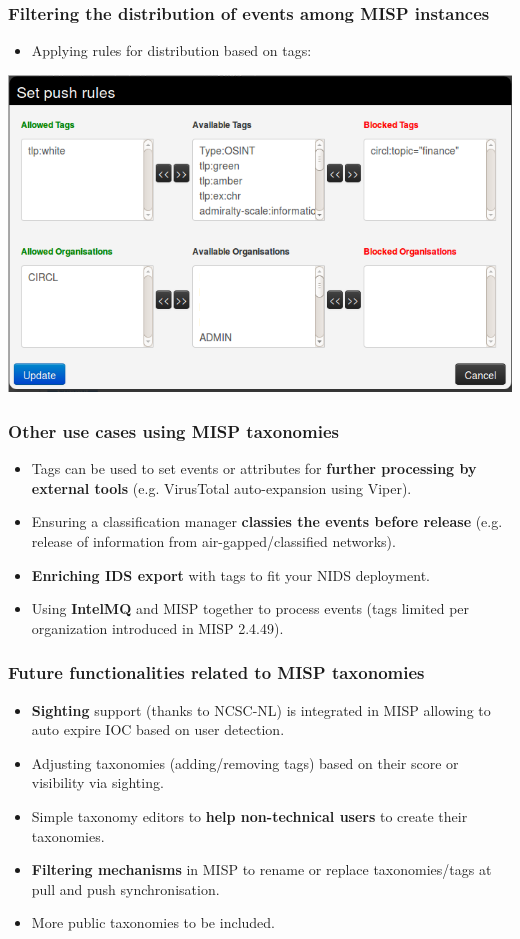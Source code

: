 \begin{frame}
\frametitle{Filtering the distribution of events among MISP instances}
\begin{itemize}
\item Applying rules for distribution based on tags:
\end{itemize}
\includegraphics[scale=0.45]{tagspush.png}
\end{frame}

\begin{frame}
        \frametitle{Other use cases using MISP taxonomies}
\begin{itemize}
    \item Tags can be used to set events or attributes for {\bf further processing by external tools} (e.g. VirusTotal auto-expansion using Viper).
    \item Ensuring a classification manager {\bf classies the events before release} (e.g. release of information from air-gapped/classified networks).
    \item {\bf Enriching IDS export} with tags to fit your NIDS deployment.
    \item Using {\bf IntelMQ} and MISP together to process events (tags limited per organization introduced in MISP 2.4.49).
\end{itemize}
\end{frame}

\begin{frame}
        \frametitle{Future functionalities related to MISP taxonomies}
\begin{itemize}
    \item {\bf Sighting} support (thanks to NCSC-NL) is integrated in MISP allowing to auto expire IOC based on user detection.
        \item Adjusting taxonomies (adding/removing tags) based on their score or visibility via sighting.
        \item Simple taxonomy editors to {\bf help non-technical users} to create their taxonomies.
        \item {\bf Filtering mechanisms} in MISP to rename or replace taxonomies/tags at pull and push synchronisation.
        \item More public taxonomies to be included.
\end{itemize}
\end{frame}


